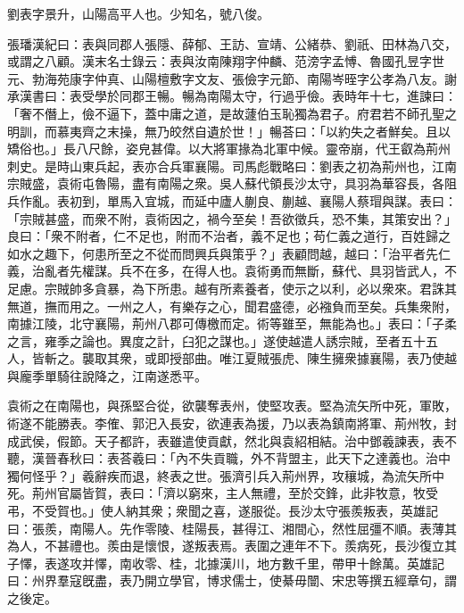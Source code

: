 
\begin{pinyinscope}
劉表字景升，山陽高平人也。少知名，號八俊。

張璠漢紀曰：表與同郡人張隱、薛郁、王訪、宣靖、公緒恭、劉祇、田林為八交，或謂之八顧。漢末名士錄云：表與汝南陳翔字仲麟、范滂字孟愽、魯國孔昱字世元、勃海苑康字仲真、山陽檀敷字文友、張儉字元節、南陽岑晊字公孝為八友。謝承漢書曰：表受學於同郡王暢。暢為南陽太守，行過乎儉。表時年十七，進諫曰：「奢不僭上，儉不逼下，蓋中庸之道，是故蘧伯玉恥獨為君子。府君若不師孔聖之明訓，而慕夷齊之末操，無乃皎然自遺於世！」暢荅曰：「以約失之者鮮矣。且以矯俗也。」長八尺餘，姿皃甚偉。以大將軍掾為北軍中候。靈帝崩，代王叡為荊州刺史。是時山東兵起，表亦合兵軍襄陽。司馬彪戰略曰：劉表之初為荊州也，江南宗賊盛，袁術屯魯陽，盡有南陽之衆。吳人蘇代領長沙太守，具羽為華容長，各阻兵作亂。表初到，單馬入宜城，而延中廬人蒯良、蒯越、襄陽人蔡瑁與謀。表曰：「宗賊甚盛，而衆不附，袁術因之，禍今至矣！吾欲徵兵，恐不集，其策安出？」良曰：「衆不附者，仁不足也，附而不治者，義不足也；苟仁義之道行，百姓歸之如水之趣下，何患所至之不從而問興兵與策乎？」表顧問越，越曰：「治平者先仁義，治亂者先權謀。兵不在多，在得人也。袁術勇而無斷，蘇代、具羽皆武人，不足慮。宗賊帥多貪暴，為下所患。越有所素養者，使示之以利，必以衆來。君誅其無道，撫而用之。一州之人，有樂存之心，聞君盛德，必襁負而至矣。兵集衆附，南據江陵，北守襄陽，荊州八郡可傳檄而定。術等雖至，無能為也。」表曰：「子柔之言，雍季之論也。異度之計，臼犯之謀也。」遂使越遣人誘宗賊，至者五十五人，皆斬之。襲取其衆，或即授部曲。唯江夏賊張虎、陳生擁衆據襄陽，表乃使越與龐季單騎往說降之，江南遂悉平。

袁術之在南陽也，與孫堅合從，欲襲奪表州，使堅攻表。堅為流矢所中死，軍敗，術遂不能勝表。李傕、郭汜入長安，欲連表為援，乃以表為鎮南將軍、荊州牧，封成武侯，假節。天子都許，表雖遣使貢獻，然北與袁紹相結。治中鄧羲諫表，表不聽，漢晉春秋曰：表荅羲曰：「內不失貢職，外不背盟主，此天下之達義也。治中獨何怪乎？」羲辭疾而退，終表之世。張濟引兵入荊州界，攻穰城，為流矢所中死。荊州官屬皆賀，表曰：「濟以窮來，主人無禮，至於交鋒，此非牧意，牧受弔，不受賀也。」使人納其衆；衆聞之喜，遂服從。長沙太守張羨叛表，英雄記曰：張羨，南陽人。先作零陵、桂陽長，甚得江、湘間心，然性屈彊不順。表薄其為人，不甚禮也。羨由是懷恨，遂叛表焉。表圍之連年不下。羨病死，長沙復立其子懌，表遂攻并懌，南收零、桂，北據漢川，地方數千里，帶甲十餘萬。英雄記曰：州界羣寇旣盡，表乃開立學官，博求儒士，使綦毋闓、宋忠等撰五經章句，謂之後定。


\end{pinyinscope}
